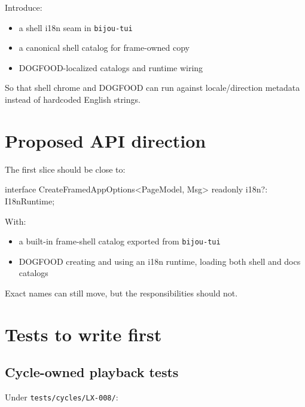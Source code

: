 Introduce:

\begin{itemize}
\tightlist
\item
  a shell i18n seam in \texttt{b\allowbreak{}i\allowbreak{}j\allowbreak{}o\allowbreak{}u\allowbreak{}-\allowbreak{}t\allowbreak{}u\allowbreak{}i}
\item
  a canonical shell catalog for frame-owned copy
\item
  DOGFOOD-localized catalogs and runtime wiring
\end{itemize}

So that shell chrome and DOGFOOD can run against locale/direction metadata instead of hardcoded English strings.

\section{Proposed API direction}\label{record-194-proposed-api-direction}

The first slice should be close to:

\begin{CodeBlock}
interface CreateFramedAppOptions<PageModel, Msg> {
  readonly i18n?: I18nRuntime;
}
\end{CodeBlock}

With:

\begin{itemize}
\tightlist
\item
  a built-in frame-shell catalog exported from \texttt{b\allowbreak{}i\allowbreak{}j\allowbreak{}o\allowbreak{}u\allowbreak{}-\allowbreak{}t\allowbreak{}u\allowbreak{}i}
\item
  DOGFOOD creating and using an i18n runtime, loading both shell and docs catalogs
\end{itemize}

Exact names can still move, but the responsibilities should not.

\section{Tests to write first}\label{record-194-tests-to-write-first}

\subsection{Cycle-owned playback tests}\label{record-194-cycle-owned-playback-tests}

Under \texttt{t\allowbreak{}e\allowbreak{}s\allowbreak{}t\allowbreak{}s\allowbreak{}/\allowbreak{}c\allowbreak{}y\allowbreak{}c\allowbreak{}l\allowbreak{}e\allowbreak{}s\allowbreak{}/\allowbreak{}L\allowbreak{}X\allowbreak{}-\allowbreak{}0\allowbreak{}0\allowbreak{}8\allowbreak{}/}:

